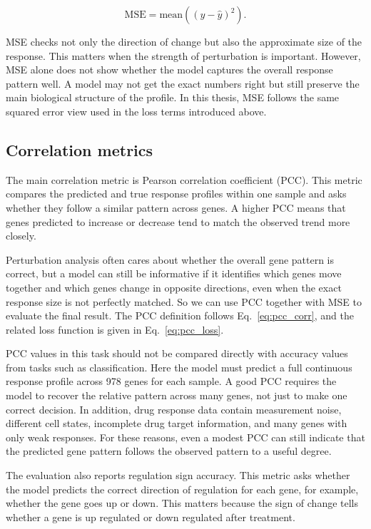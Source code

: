 \begin{equation}
\label{eq:test_mse}
\mathrm{MSE}=\mathrm{mean}\!\left((y-\hat{y})^2\right).
\end{equation}

\noindent MSE checks not only the direction of change but also the approximate size of the response. This matters when the strength of perturbation is important. However, MSE alone does not show whether the model captures the overall response pattern well. A model may not get the exact numbers right but still preserve the main biological structure of the profile. In this thesis, MSE follows the same squared error view used in the loss terms introduced above.

\subsection{Correlation metrics}
The main correlation metric is Pearson correlation coefficient (PCC). This metric compares the predicted and true response profiles within one sample and asks whether they follow a similar pattern across genes. A higher PCC means that genes predicted to increase or decrease tend to match the observed trend more closely.

\noindent Perturbation analysis often cares about whether the overall gene pattern is correct, but a model can still be informative if it identifies which genes move together and which genes change in opposite directions, even when the exact response size is not perfectly matched. So we can use PCC together with MSE to evaluate the final result. The PCC definition follows Eq.~\ref{eq:pcc_corr}, and the related loss function is given in Eq.~\ref{eq:pcc_loss}.

\noindent PCC values in this task should not be compared directly with accuracy values from tasks such as classification. Here the model must predict a full continuous response profile across 978 genes for each sample. A good PCC requires the model to recover the relative pattern across many genes, not just to make one correct decision. In addition, drug response data contain measurement noise, different cell states, incomplete drug target information, and many genes with only weak responses. For these reasons, even a modest PCC can still indicate that the predicted gene pattern follows the observed pattern to a useful degree.

\noindent The evaluation also reports regulation sign accuracy. This metric asks whether the model predicts the correct direction of regulation for each gene, for example, whether the gene goes up or down. This matters because the sign of change tells whether a gene is up regulated or down regulated after treatment.

